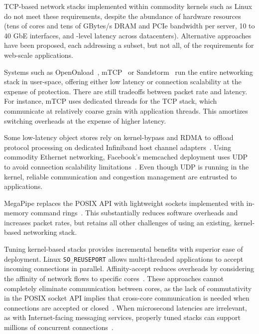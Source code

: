 TCP-based network stacks implemented within commodity kernels such as
Linux do not meet these requirements, despite the abundance of hardware
resources (tens of cores and tens of GBytes/s DRAM and PCIe
bandwidth per server, 10 to 40 GbE interfaces, and \microsecond-level
latency across datacenters).
Alternative approaches have been proposed, each addressing a subset,
but not all, of
the requirements for web-scale applications.


 Systems such as
OpenOnload~\cite{openonload}, mTCP~\cite{jeong2014mtcp} or
Sandstorm~\cite{sandstorm} run the entire networking stack in
user-space, offering either low latency or connection scalability at
the expense of protection. There are still tradeoffs between packet
rate and latency. For instance, mTCP uses dedicated threads for the
TCP stack, which communicate at relatively coarse grain with
application threads. This amortizes switching overheads at the expense
of higher latency.

 Some low-latency object stores rely on
kernel-bypass and RDMA to offload protocol processing on dedicated
Infiniband host channel
adapters~\cite{dragojevic14farm,DBLP:conf/icpp/JoseSLZHWIOWSP11,mitchell:rdma,DBLP:conf/sosp/OngaroRSOR11}.
Using commodity Ethernet networking, Facebook's memcached deployment
uses UDP to avoid connection scalability
limitations~\cite{DBLP:conf/nsdi/NishtalaFGKLLMPPSSTV13}. Even though UDP is running in
the kernel, reliable communication and congestion management are
entrusted to applications.

 MegaPipe replaces the POSIX
API with lightweight sockets implemented with in-memory command
rings~\cite{DBLP:conf/osdi/HanMCR12}. This substantially reduces software
overheads and increases packet rates, but retains all other challenges
of using an existing, kernel-based networking stack.

 Tuning kernel-based stacks provides
incremental benefits with superior ease of deployment.  Linux
\texttt{SO\_REUSEPORT} allows multi-threaded applications to accept
incoming connections in parallel. Affinity-accept reduces overheads by
considering the affinity of network flows to specific
cores~\cite{DBLP:conf/eurosys/PesterevSZM12}. These approaches cannot
completely eliminate communication between cores, as the lack of
commutativity in the POSIX socket API implies that cross-core
communication is needed when connections are accepted or
closed~\cite{DBLP:conf/sosp/ClementsKZMK13}. When microsecond
latencies are irrelevant, as with Internet-facing
messaging services, properly tuned stacks can support millions of
concurrent connections~\cite{whatsapp-2mil}.
